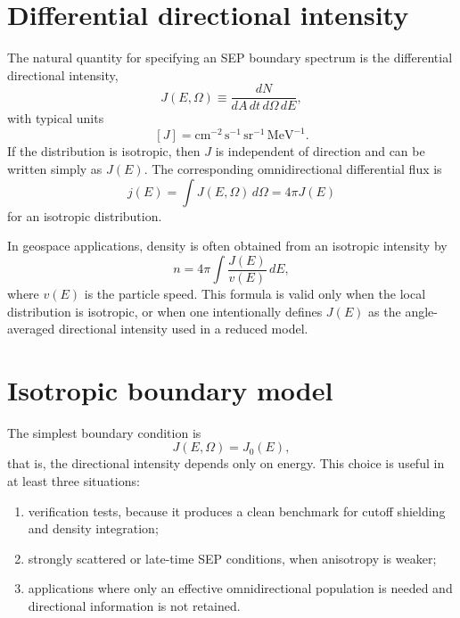 \documentclass[11pt]{article}
\begin{document}
\section{Differential directional intensity}
The natural quantity for specifying an SEP boundary spectrum is the differential directional intensity,
\begin{equation}
J(E,\Omega) \equiv \frac{dN}{dA\,dt\,d\Omega\,dE},
\end{equation}
with typical units
\begin{equation}
\left[ J \right] = \mathrm{cm^{-2}\,s^{-1}\,sr^{-1}\,MeV^{-1}}.
\end{equation}
If the distribution is isotropic, then $J$ is independent of direction and can be written simply as $J(E)$. The corresponding omnidirectional differential flux is
\begin{equation}
 j(E) = \int J(E,\Omega)\,d\Omega = 4\pi J(E)
\end{equation}
for an isotropic distribution.

In geospace applications, density is often obtained from an isotropic intensity by
\begin{equation}
 n = 4\pi \int \frac{J(E)}{v(E)}\,dE,
\end{equation}
where $v(E)$ is the particle speed. This formula is valid only when the local distribution is isotropic, or when one intentionally defines $J(E)$ as the angle-averaged directional intensity used in a reduced model.

\section{Isotropic boundary model}
The simplest boundary condition is
\begin{equation}
J(E,\Omega)=J_0(E),
\end{equation}
that is, the directional intensity depends only on energy. This choice is useful in at least three situations:
\begin{enumerate}
  \item verification tests, because it produces a clean benchmark for cutoff shielding and density integration;
  \item strongly scattered or late-time SEP conditions, when anisotropy is weaker;
  \item applications where only an effective omnidirectional population is needed and directional information is not retained.
\end{enumerate}
\end{document}
